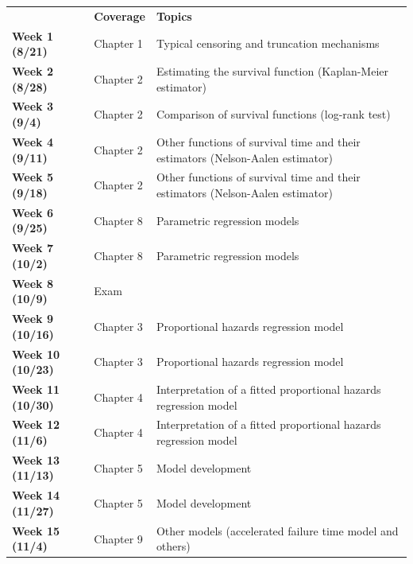 \documentclass[10pt]{article}
\begin{document}
\begin{center}
\renewcommand{\arraystretch}{1.3}
\begin{tabular}{|p{} p{} p{} |}
\hline
& \textbf{Coverage} & \textbf{Topics} \\
\textbf{Week 1 (8/21)} & Chapter 1 & Typical censoring and truncation mechanisms\\
\textbf{Week 2 (8/28)} & Chapter 2 & Estimating the survival function (Kaplan-Meier estimator)\\
\textbf{Week 3 (9/4)} & Chapter 2 & Comparison of survival functions (log-rank test)\\
\textbf{Week 4 (9/11)} & Chapter 2 & Other functions of survival time and their estimators (Nelson-Aalen estimator)\\
\textbf{Week 5 (9/18)} & Chapter 2 & Other functions of survival time and their estimators (Nelson-Aalen estimator)\\
\textbf{Week 6 (9/25)} & Chapter 8 & Parametric regression models\\
\textbf{Week 7 (10/2)} & Chapter 8 & Parametric regression models\\
\textbf{Week 8 (10/9)} & Exam & \\
\textbf{Week 9 (10/16)} & Chapter 3 & Proportional hazards regression model\\
\textbf{Week 10 (10/23)} & Chapter 3 & Proportional hazards regression model\\
\textbf{Week 11 (10/30)} & Chapter 4 & Interpretation of a fitted proportional hazards regression model\\
\textbf{Week 12 (11/6)} & Chapter 4 & Interpretation of a fitted proportional hazards regression model\\
\textbf{Week 13 (11/13)} & Chapter 5 & Model development\\
\textbf{Week 14 (11/27)} & Chapter 5 & Model development\\
\textbf{Week 15 (11/4)} & Chapter 9 & Other models (accelerated failure time model and others)\\
\hline
\end{tabular}
\end{center}
\end{document}

